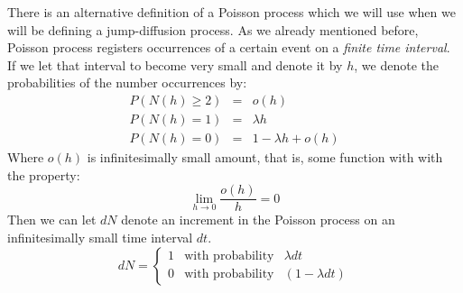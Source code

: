 \documentclass[times, utf8, diplomski]{fer}
\begin{document}
		\begin{center}
		\end{center}

		\noindent There is an alternative definition of a Poisson process which we will use when we will be defining a jump-diffusion process. As we already mentioned before, Poisson process registers occurrences of a certain event on a \textit{finite time interval}. If we let that interval to become very small and denote it by $h$, we denote the probabilities of the number occurrences by: 
		$$
			\begin{array}{rcl}
				P(N(h) \geq 2) &\mbox{=}& o(h) \\
				P(N(h) = 1) &\mbox{=}& \lambda h \\
				P(N(h) = 0) &\mbox{=}& 1 - \lambda h + o(h)
			\end{array}
		$$
		Where $o(h)$ is infinitesimally small amount, that is, some function with with the property: $$\lim_{h \to 0} \frac{o(h)}{h} = 0$$ Then we can let $dN$ denote an increment in the Poisson process on an infinitesimally small time interval $dt$. $$ dN = \left\{  \begin{array}{lcl} 1 & \mbox{with probability} & \lambda dt \\
																	0 & \mbox{with probability} & (1 - \lambda dt) \end{array} \right. $$
	
\end{document}
